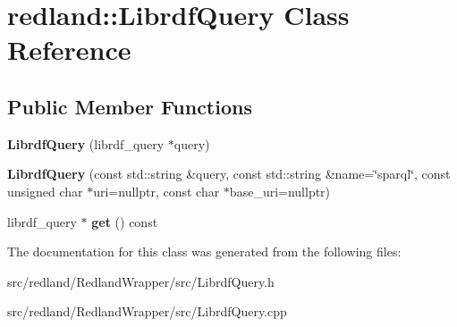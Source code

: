 \hypertarget{classredland_1_1LibrdfQuery}{}\section{redland\+:\+:Librdf\+Query Class Reference}
\label{classredland_1_1LibrdfQuery}
\subsection*{Public Member Functions}
\begin{DoxyCompactItemize}
\item 
\mbox{\label{classredland_1_1LibrdfQuery_aacca5302206092fbd8908934d2236021}} 
{\bfseries Librdf\+Query} (librdf\+\_\+query $\ast$query)
\item 
\mbox{\label{classredland_1_1LibrdfQuery_a63a49930cc3c54938203683eab2c96fb}} 
{\bfseries Librdf\+Query} (const std\+::string \&query, const std\+::string \&name=\char`\"{}sparql\char`\"{}, const unsigned char $\ast$uri=nullptr, const char $\ast$base\+\_\+uri=nullptr)
\item 
\mbox{\label{classredland_1_1LibrdfQuery_a0302f24051ae2050bc2e802a59364554}} 
librdf\+\_\+query $\ast$ {\bfseries get} () const
\end{DoxyCompactItemize}


The documentation for this class was generated from the following files\+:\begin{DoxyCompactItemize}
\item 
src/redland/\+Redland\+Wrapper/src/Librdf\+Query.\+h\item 
src/redland/\+Redland\+Wrapper/src/Librdf\+Query.\+cpp\end{DoxyCompactItemize}
